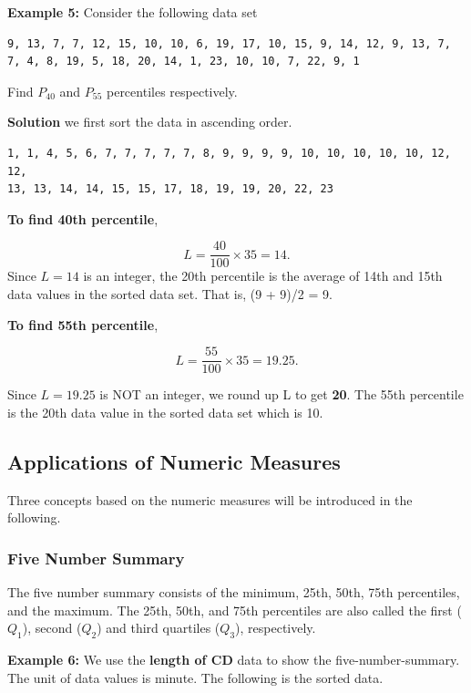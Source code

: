 \documentclass[
]{book}
\begin{document}
\textbf{Example 5:} Consider the following data set

\begin{verbatim}
9, 13, 7, 7, 12, 15, 10, 10, 6, 19, 17, 10, 15, 9, 14, 12, 9, 13, 7, 
7, 4, 8, 19, 5, 18, 20, 14, 1, 23, 10, 10, 7, 22, 9, 1
\end{verbatim}

Find \(P_{40}\) and \(P_{55}\) percentiles respectively.

\textbf{Solution} we first sort the data in ascending order.

\begin{verbatim}
1, 1, 4, 5, 6, 7, 7, 7, 7, 7, 8, 9, 9, 9, 9, 10, 10, 10, 10, 10, 12, 12,
13, 13, 14, 14, 15, 15, 17, 18, 19, 19, 20, 22, 23
\end{verbatim}

\textbf{To find 40th percentile},

\[
L = \frac{40}{100}\times 35 = 14.
\]
Since \(L = 14\) is an integer, the 20th percentile is the average of 14th and 15th data values in the sorted data set. That is, (9 + 9)/2 = 9.

\textbf{To find 55th percentile},

\[
L = \frac{55}{100}\times 35 = 19.25.
\]

Since \(L=19.25\) is NOT an integer, we round up L to get \textbf{20}. The 55th percentile is the 20th data value in the sorted data set which is 10.

\hypertarget{applications-of-numeric-measures}{%
\subsection{Applications of Numeric Measures}\label{applications-of-numeric-measures}}

Three concepts based on the numeric measures will be introduced in the following.

\hypertarget{five-number-summary}{%
\subsubsection{Five Number Summary}\label{five-number-summary}}

The five number summary consists of the minimum, 25th, 50th, 75th percentiles, and the maximum. The 25th, 50th, and 75th percentiles are also called the first (\(Q_1\)), second (\(Q_2\)) and third quartiles (\(Q_3\)), respectively.

\textbf{Example 6: } We use the \textbf{length of CD} data to show the five-number-summary. The unit of data values is minute. The following is the sorted data.
\end{document}
